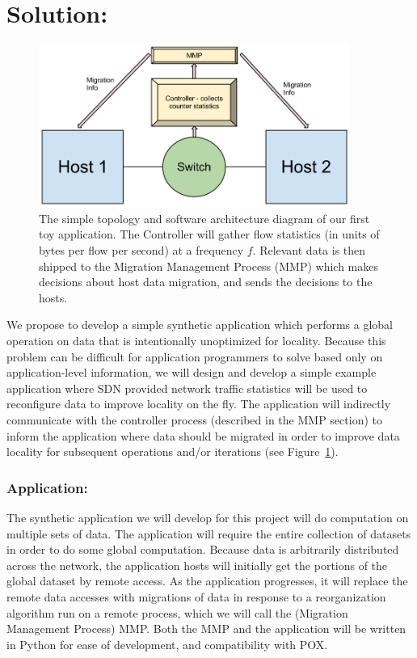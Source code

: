 \documentclass[12pt]{article} \usepackage{graphicx} \usepackage{amsmath}
\begin{document}
\section*{Solution:} \label{solution} 
\begin{figure}[t]
  \centerline{\includegraphics[width=4.0in]{img/toy_arch.png}} 
  \caption{
  The simple topology and software architecture diagram of our first toy
  application.  The Controller will gather flow statistics (in units of bytes
  per flow per second) at a frequency $f$. Relevant data is then shipped to the
  Migration Management Process (MMP) which makes decisions about host data
  migration, and sends the decisions to the hosts.} 
  \label{fig:toy_arch} 
\end{figure} 
We propose to develop a simple synthetic application which performs a global
operation on data that is intentionally unoptimized for locality.  Because this
problem can be difficult for application programmers to solve based only on
application-level information, we will design and develop a simple example
application where SDN provided network traffic statistics will be used to
reconfigure data to improve locality on the fly.  The application will
indirectly communicate with the controller process (described in the MMP
section) to inform the application where data should be migrated in order to
improve data locality for subsequent operations and/or iterations (see
Figure~\ref{fig:toy_arch}).

\subsubsection*{Application:} \label{application} 
The synthetic application we will develop for this project will do computation
on multiple sets of data.  The application will require the entire collection  of datasets  
in order to do some global computation.  Because data is arbitrarily distributed
across the network, the application hosts will initially get the portions of the
global dataset by remote access.  As the application progresses, it will
replace the remote data accesses with migrations of data in response to a
reorganization algorithm run on a remote process, which we will call the
(Migration Management Process) MMP.  Both the MMP and the application will be
written in Python for ease of development, and compatibility with POX.
\end{document}
